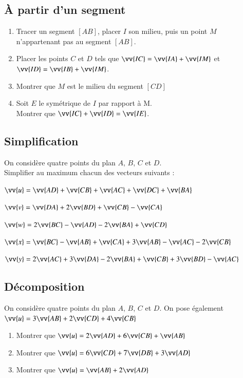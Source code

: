 \documentclass[oneside,12pt]{article}          %
\begin{document}
\subsection{À partir d'un segment}
\begin{enumerate}
    \item Tracer un segment $[AB]$, placer $I$ son milieu, puis un point $M$ n'appartenant pas au segment $[AB]$.
    \item Placer les points $C$ et $D$ tels que $\vv{IC}=\vv{IA}+\vv{IM}$ et $\vv{ID}=\vv{IB}+\vv{IM}$.
    \item Montrer que $M$ est le milieu du segment $[CD]$
    \item Soit $E$ le symétrique de $I$ par rapport à M. \\Montrer que $\vv{IC}+\vv{ID}=\vv{IE}$.
\end{enumerate}



\subsection{Simplification}
On considère quatre points du plan $A$, $B$, $C$ et $D$.\\
Simplifier au maximum chacun des vecteurs suivants :

$\vv{u}=\vv{AD}+\vv{CB}+\vv{AC}+\vv{DC}+\vv{BA}$

$\vv{v}=\vv{DA}+2\vv{BD}+\vv{CB}-\vv{CA}$

$\vv{w}=2\vv{BC}-\vv{AD}-2\vv{BA}+\vv{CD}$

$\vv{x}=\vv{BC}-\vv{AB}+\vv{CA}+3\vv{AB}-\vv{AC}-2\vv{CB}$

$\vv{y}=2\vv{AC}+3\vv{DA}-2\vv{BA}+\vv{CB}+3\vv{BD}-\vv{AC}$



\subsection{Décomposition}
On considère quatre points du plan $A$, $B$, $C$ et $D$. On pose également $\vv{u}=3\vv{AB}+2\vv{CD}+4\vv{CB}$
\begin{enumerate}
	\item Montrer que $\vv{u}=2\vv{AD}+6\vv{CB}+\vv{AB}$
	\item Montrer que $\vv{u}=6\vv{CD}+7\vv{DB}+3\vv{AD}$
	\item Montrer que $\vv{u}=\vv{AB}+2\vv{AD}$
\end{enumerate}
\end{document}
